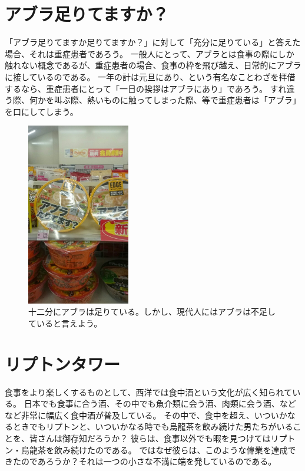 \section{アブラ足りてますか？}
「アブラ足りてますか足りてますか？」に対して「充分に足りている」と答えた場合、それは重症患者であろう。
一般人にとって、アブラとは食事の際にしか触れない概念であるが、重症患者の場合、食事の枠を飛び越え、日常的にアブラに接しているのである。
一年の計は元旦にあり、という有名なことわざを拝借するなら、重症患者にとって「一日の挨拶はアブラにあり」であろう。
すれ違う際、何かを叫ぶ際、熱いものに触ってしまった際、等で重症患者は「アブラ」を口にしてしまう。


\begin{figure}[h]
\centering
\includegraphics[width=0.4\textwidth]{./section/Shokuji/figures/AburaTaritemasuka.jpg}
  \caption{十二分にアブラは足りている。しかし、現代人にはアブラは不足していると言えよう。}
\label{Fig:Shigehisa}
\end{figure}

\section{リプトンタワー}
食事をより楽しくするものとして、西洋では食中酒という文化が広く知られている。
日本でも食事に合う酒、その中でも魚介類に会う酒、肉類に会う酒、などなど非常に幅広く食中酒が普及している。
その中で、食中を超え、いついかなるときでもリプトンと、いついかなる時でも烏龍茶を飲み続けた男たちがいることを、皆さんは御存知だろうか？
彼らは、食事以外でも暇を見つけてはリプトン・烏龍茶を飲み続けたのである。
ではなぜ彼らは、このような偉業を達成できたのであろうか？それは一つの小さな不満に端を発しているのである。

